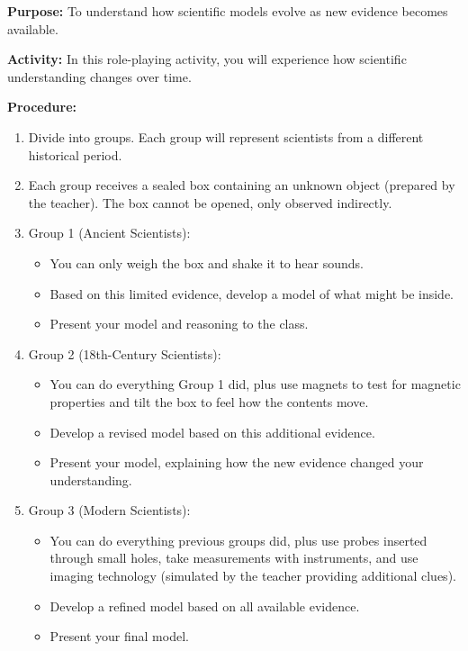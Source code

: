 \documentclass[justified,notoc]{tufte-book}
\newenvironment{investigation}[1]{%
    \begin{tcolorbox}[colback=info!10,colframe=info,title=\textbf{Investigation: #1}]
}{%
    \end{tcolorbox}
}
\begin{document}
\begin{investigation}{Modeling the Evolution of Scientific Thinking}
\textbf{Purpose:} To understand how scientific models evolve as new evidence becomes available.

\textbf{Activity:} In this role-playing activity, you will experience how scientific understanding changes over time.

\textbf{Procedure:}
\begin{enumerate}
    \item Divide into groups. Each group will represent scientists from a different historical period.
    
    \item Each group receives a sealed box containing an unknown object (prepared by the teacher). The box cannot be opened, only observed indirectly.
    
    \item Group 1 (Ancient Scientists):
    \begin{itemize}
        \item You can only weigh the box and shake it to hear sounds.
        \item Based on this limited evidence, develop a model of what might be inside.
        \item Present your model and reasoning to the class.
    \end{itemize}
    
    \item Group 2 (18th-Century Scientists):
    \begin{itemize}
        \item You can do everything Group 1 did, plus use magnets to test for magnetic properties and tilt the box to feel how the contents move.
        \item Develop a revised model based on this additional evidence.
        \item Present your model, explaining how the new evidence changed your understanding.
    \end{itemize}
    
    \item Group 3 (Modern Scientists):
    \begin{itemize}
        \item You can do everything previous groups did, plus use probes inserted through small holes, take measurements with instruments, and use imaging technology (simulated by the teacher providing additional clues).
        \item Develop a refined model based on all available evidence.
        \item Present your final model.
    \end{itemize}
    

\end{enumerate}
\end{investigation}
\end{document}
